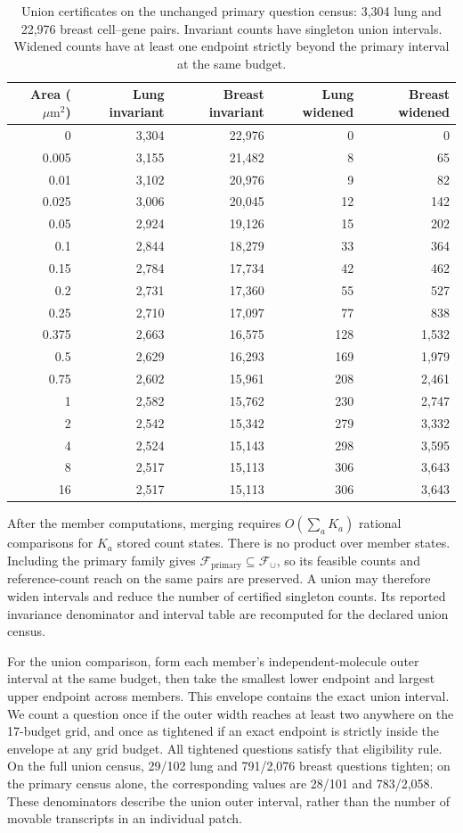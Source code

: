 \documentclass[10pt,letterpaper]{article}
\begin{document}
\begin{table}[ht]\centering
\begin{tabular}{rrrrr}\toprule
Area ($\mu\mathrm m^2$)&Lung invariant&Breast invariant&Lung widened&Breast widened\\\midrule
0&3,304&22,976&0&0\\
0.005&3,155&21,482&8&65\\
0.01&3,102&20,976&9&82\\
0.025&3,006&20,045&12&142\\
0.05&2,924&19,126&15&202\\
0.1&2,844&18,279&33&364\\
0.15&2,784&17,734&42&462\\
0.2&2,731&17,360&55&527\\
0.25&2,710&17,097&77&838\\
0.375&2,663&16,575&128&1,532\\
0.5&2,629&16,293&169&1,979\\
0.75&2,602&15,961&208&2,461\\
1&2,582&15,762&230&2,747\\
2&2,542&15,342&279&3,332\\
4&2,524&15,143&298&3,595\\
8&2,517&15,113&306&3,643\\
16&2,517&15,113&306&3,643\\
\bottomrule\end{tabular}
\caption{Union certificates on the unchanged primary question census: 3,304 lung and 22,976 breast cell--gene pairs. Invariant counts have singleton union intervals. Widened counts have at least one endpoint strictly beyond the primary interval at the same budget.}\label{tab:union-budgets}
\end{table}

After the member computations, merging requires $O(\sum_a K_a)$ rational comparisons for $K_a$ stored count states. There is no product over member states. Including the primary family gives $\mathcal F_{\mathrm{primary}}\subseteq\mathcal F_\cup$, so its feasible counts and reference-count reach on the same pairs are preserved. A union may therefore widen intervals and reduce the number of certified singleton counts. Its reported invariance denominator and interval table are recomputed for the declared union census.

For the union comparison, form each member's independent-molecule outer interval at the same budget, then take the smallest lower endpoint and largest upper endpoint across members. This envelope contains the exact union interval. We count a question once if the outer width reaches at least two anywhere on the 17-budget grid, and once as tightened if an exact endpoint is strictly inside the envelope at any grid budget. All tightened questions satisfy that eligibility rule. On the full union census, 29/102 lung and 791/2,076 breast questions tighten; on the primary census alone, the corresponding values are 28/101 and 783/2,058. These denominators describe the union outer interval, rather than the number of movable transcripts in an individual patch.
\end{document}

